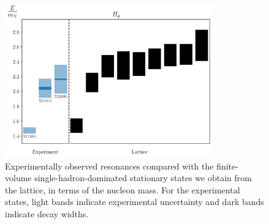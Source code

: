 \begin{figure}[H]
    \centering
    \includegraphics[width=0.8\textwidth]{figures/sigmas/hg/expvslat.pdf}
    \caption{Experimentally observed resonances compared with the finite-volume single-hadron-dominated stationary states we obtain from the lattice, in terms of the nucleon mass. For the experimental states, light bands indicate experimental uncertainty and dark bands indicate decay widths.}\label{fig:hg_exp}
\end{figure}

